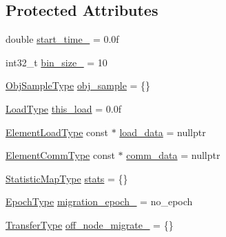 \subsection*{Protected Attributes}
\begin{DoxyCompactItemize}
\item 
double \hyperlink{structvt_1_1vrt_1_1collection_1_1lb_1_1_base_l_b_a457dff7a12e34494fa0537c78120eb41}{start\+\_\+time\+\_\+} = 0.\+0f
\item 
int32\+\_\+t \hyperlink{structvt_1_1vrt_1_1collection_1_1lb_1_1_base_l_b_a2623b9a1e60be9f6413d86fbff9e80bf}{bin\+\_\+size\+\_\+} = 10
\item 
\hyperlink{structvt_1_1vrt_1_1collection_1_1lb_1_1_base_l_b_a331d7da5bbf2883238427d86b54ddd7b}{Obj\+Sample\+Type} \hyperlink{structvt_1_1vrt_1_1collection_1_1lb_1_1_base_l_b_a82775a8f051e975a1a7f3046e7af61ac}{obj\+\_\+sample} = \{\}
\item 
\hyperlink{structvt_1_1vrt_1_1collection_1_1lb_1_1_base_l_b_a215e22b9f12678303f49615ae3be05cc}{Load\+Type} \hyperlink{structvt_1_1vrt_1_1collection_1_1lb_1_1_base_l_b_ab7df874591552c346fc77858983fbbec}{this\+\_\+load} = 0.\+0f
\item 
\hyperlink{structvt_1_1vrt_1_1collection_1_1lb_1_1_base_l_b_aa286d31a0820a8fc9218ccb858368fca}{Element\+Load\+Type} const  $\ast$ \hyperlink{structvt_1_1vrt_1_1collection_1_1lb_1_1_base_l_b_ac430d066bb19421d6241753059e8f4c8}{load\+\_\+data} = nullptr
\item 
\hyperlink{structvt_1_1vrt_1_1collection_1_1lb_1_1_base_l_b_ac3f8560bfe41aa593eb7d5bd1241cc4c}{Element\+Comm\+Type} const  $\ast$ \hyperlink{structvt_1_1vrt_1_1collection_1_1lb_1_1_base_l_b_a8d519b94ce4741da7049cb2b7b513963}{comm\+\_\+data} = nullptr
\item 
\hyperlink{structvt_1_1vrt_1_1collection_1_1lb_1_1_base_l_b_a6e8dead5546b2054f604ca258e1e815e}{Statistic\+Map\+Type} \hyperlink{structvt_1_1vrt_1_1collection_1_1lb_1_1_base_l_b_a249359351566423733a7391dcdc2e203}{stats} = \{\}
\item 
\hyperlink{namespacevt_a985a5adf291c34a3ca263b3378388236}{Epoch\+Type} \hyperlink{structvt_1_1vrt_1_1collection_1_1lb_1_1_base_l_b_a542fc9b588392bd5bc30554b2b53c96c}{migration\+\_\+epoch\+\_\+} = no\+\_\+epoch
\item 
\hyperlink{structvt_1_1vrt_1_1collection_1_1lb_1_1_base_l_b_a0a5f834082d85c558bdaf84c464c1ead}{Transfer\+Type} \hyperlink{structvt_1_1vrt_1_1collection_1_1lb_1_1_base_l_b_aa6e16e52738ab5d6f85be39641db94bd}{off\+\_\+node\+\_\+migrate\+\_\+} = \{\}
\item 

\end{DoxyCompactItemize}

